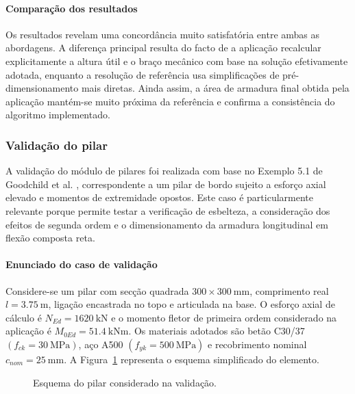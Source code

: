 \paragraph{Comparação dos resultados}
Os resultados revelam uma concordância muito satisfatória entre ambas as abordagens. A diferença principal resulta do facto de a aplicação recalcular explicitamente a altura útil e o braço mecânico com base na solução efetivamente adotada, enquanto a resolução de referência usa simplificações de pré-dimensionamento mais diretas.
Ainda assim, a área de armadura final obtida pela aplicação mantém-se muito próxima da referência e confirma a consistência do algoritmo implementado.

\subsubsection{Validação do pilar}

A validação do módulo de pilares foi realizada com base no Exemplo 5.1 de Goodchild et al. \cite{Goodchild}, correspondente a um pilar de bordo sujeito a esforço axial elevado e momentos de extremidade opostos. Este caso é particularmente relevante porque permite testar a verificação de esbelteza, a consideração dos efeitos de segunda ordem e o dimensionamento da armadura longitudinal em flexão composta reta.

\paragraph{Enunciado do caso de validação}

Considere-se um pilar com secção quadrada \(300 \times 300\ \text{mm}\), comprimento real \(l = 3.75\ \text{m}\), ligação encastrada no topo e articulada na base. O esforço axial de cálculo é \(N_{Ed}=1620\ \text{kN}\) e o momento fletor de primeira ordem considerado na aplicação é \(M_{0Ed}=51.4\ \text{kNm}\). Os materiais adotados são betão C30/37 \((f_{ck}=30\ \text{MPa})\), aço A500 \((f_{yk}=500\ \text{MPa})\) e recobrimento nominal \(c_{nom}=25\ \text{mm}\). A Figura~\ref{fig:pilar_validacao} representa o esquema simplificado do elemento.

\begin{figure}[H]
\centering
{}
\caption{Esquema do pilar considerado na validação.}
\label{fig:pilar_validacao}
\end{figure}

